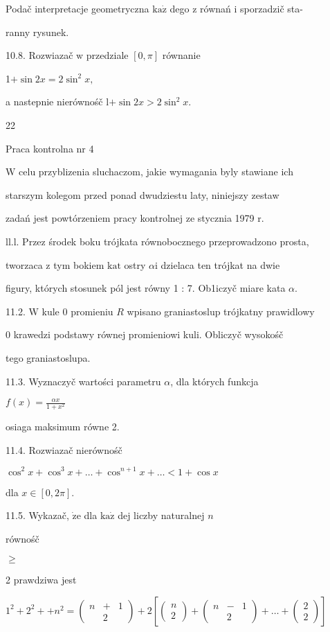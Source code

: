 \documentclass[a4paper,12pt]{article}
\begin{document}
Podač interpretacje geometryczna $\mathrm{k}\mathrm{a}\dot{\mathrm{z}}$ dego $\mathrm{z}$ równań $\mathrm{i}$ sporzadzič sta-

ranny rysunek.

10.8. Rozwiazač $\mathrm{w}$ przedziale $[0,\pi]$ równanie

1$+ \sin 2x=2\sin^{2}x,$

a nastepnie nierównośč l$+ \sin 2x>2\sin^{2}x.$





22

Praca kontrolna nr 4

$\mathrm{W}$ celu przyblizenia sluchaczom, jakie wymagania byly stawiane ich

starszym kolegom przed ponad dwudziestu laty, niniejszy zestaw

zadań jest powtórzeniem pracy kontrolnej ze stycznia 1979 $\mathrm{r}.$

ll.l. Przez środek boku trójkata równobocznego przeprowadzono prosta,

tworzaca $\mathrm{z}$ tym bokiem $\mathrm{k}\mathrm{a}\mathrm{t}$ ostry $\alpha \mathrm{i}$ dzielaca ten trójkat na dwie

figury, których stosunek pól jest równy 1 : 7. Ob1iczyč miare kata $\alpha.$

11.2. $\mathrm{W}$ kule $0$ promieniu $R$ wpisano graniastoslup trójkatny prawidlowy

$0$ krawedzi podstawy równej promieniowi kuli. Obliczyč wysokośč

tego graniastoslupa.

11.3. Wyznaczyč wartości parametru $\alpha$, dla których funkcja

$f(x)=\displaystyle \frac{\alpha x}{1+x^{2}}$

osiaga maksimum równe 2.

11.4. Rozwiazač nierównośč

$\cos^{2}x+\cos^{3}x+\ldots+\cos^{n+1}x+\ldots<1+\cos x$

dla $x\in[0,2\pi].$

11.5. Wykazač, $\dot{\mathrm{z}}\mathrm{e}$ dla $\mathrm{k}\mathrm{a}\dot{\mathrm{z}}$ dej liczby naturalnej $n$

równośč

$\geq$

2 prawdziwa jest

$1^{2}+2^{2}++n^{2}=\left(\begin{array}{lll}
n & + & 1\\
 & 2 & 
\end{array}\right)+2[\left(\begin{array}{l}
n\\
2
\end{array}\right)+\left(\begin{array}{lll}
n & - & 1\\
 & 2 & 
\end{array}\right)+\ldots+\left(\begin{array}{l}
2\\
2
\end{array}\right)]$
\end{document}
